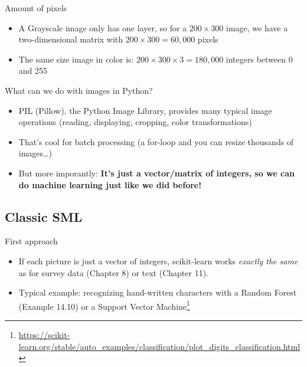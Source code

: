 \begin{frame}{Amount of pixels}
  \begin{itemize}
    \item A Grayscale image only has one layer, so for a $200\times 300$ image, we have a two-dimensional matrix with $200\times 300 = 60,000$ pixels
    \item The same size image in color is: $200\times 300\times 3 = 180,000$ integers between 0 and 255
  \end{itemize}
\end{frame}

\begin{frame}{What can we do with images in Python?}
  \begin{itemize}
  \item PIL (Pillow), the Python Image Library, provides many typical image operations (reading, displaying, cropping, color transformations)
  \item That's cool for batch processing (a for-loop and you can resize thousands of images\ldots)
  \item But more imporantly: \textbf{It's just a vector/matrix of integers, so we can do machine learning just like we did before!}
  \end{itemize}
\end{frame}

  

\subsection{Classic SML}

\begin{frame}{First approach}
  \begin{itemize}
  \item If each picture is just a vector of integers, scikit-learn works \emph{exactly the same} as for survey data (Chapter 8) or text (Chapter 11).
  \item Typical example: recognizing hand-written characters with a Random Forest (Example 14.10) or a Support Vector Machine\footnote{\url{https://scikit-learn.org/stable/auto\_examples/classification/plot\_digits\_classification.html}}
  \end{itemize}
\end{frame}


